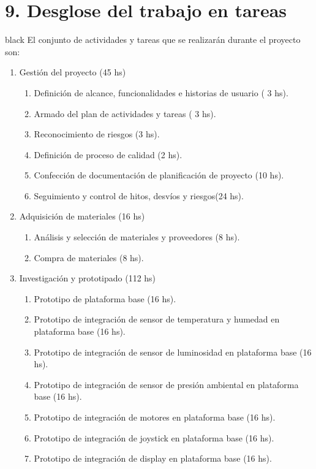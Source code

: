 \documentclass[
11pt, %
]{charter}
\begin{document}
\section{9. Desglose del trabajo en tareas}
\label{sec:wbs}

\begin{consigna}{black}
El conjunto de actividades y tareas que se realizarán durante el proyecto son:

\begin{enumerate}

\item Gestión del proyecto (45 hs)
	\begin{enumerate}
	\item Definición de alcance, funcionalidades e historias de usuario ( 3 hs).	
	\item Armado del plan de actividades y tareas ( 3 hs).
	\item Reconocimiento de riesgos (3 hs).
	\item Definición de proceso de calidad (2 hs).
	\item Confección de documentación de planificación de proyecto (10 hs).
	\item Seguimiento y control de hitos, desvíos y riesgos(24 hs).	
	\end{enumerate}
\item Adquisición de materiales (16 hs)
	\begin{enumerate}
	\item Análisis y selección de materiales y proveedores (8 hs).
	\item Compra de materiales (8 hs).
	\end{enumerate}
\item Investigación y prototipado (112 hs)
	\begin{enumerate}
	\item Prototipo de plataforma base (16 hs).
	\item Prototipo de integración de sensor de temperatura y humedad en plataforma base (16 hs).
	\item Prototipo de integración de sensor de luminosidad en plataforma base (16 hs).
	\item Prototipo de integración de sensor de presión ambiental en plataforma base (16 hs).
	\item Prototipo de integración de motores en plataforma base (16 hs).
	\item Prototipo de integración de joystick en plataforma base (16 hs).
	\item Prototipo de integración de display en plataforma base (16 hs).

\end{enumerate}
\end{enumerate}
\end{consigna}
\end{document}
